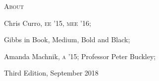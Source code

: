 \documentclass{article}
\begin{document}
\begin{minipage}[t]{0.46\linewidth}
\vspace{0.05in}

\scshape \fontsize{16pt}{16pt}\selectfont {} About
\fontsize{10pt}{10pt}\selectfont
\upshape
\raggedright

\begin{description}
\itemsep1pt
\item[Contributors:] Chris Curro, {\scshape ee '15, mee '16}; 
\item[Typefaces:] Gibbs in Book, Medium, Bold and Black;
\item[Special Thanks:] Amanda Machnik, {\scshape a '15}; Professor Peter Buckley;
\item[Printing:] Third Edition, September 2018
\end{description}
\end{minipage}
\end{document}
